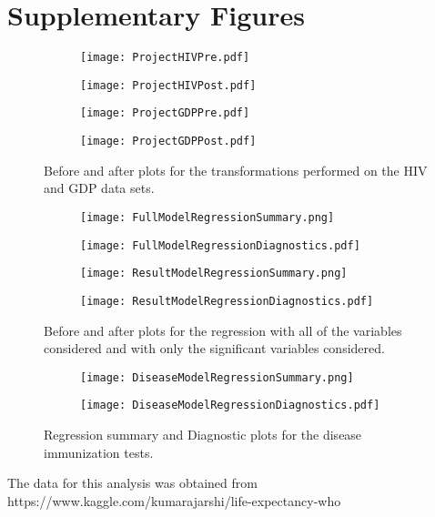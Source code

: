 \documentclass{article}
\begin{document}
\section*{Supplementary Figures}
	\begin{figure}[ht]
	\centering
		\begin{subfigure}[b]{0.49\textwidth}
			\centering
			\texttt{[image: ProjectHIVPre.pdf]}
		\end{subfigure}
		\begin{subfigure}[b]{0.49\textwidth}
			\centering
			\texttt{[image: ProjectHIVPost.pdf]}
		\end{subfigure}
		\begin{subfigure}[b]{0.49\textwidth}
			\centering
			\texttt{[image: ProjectGDPPre.pdf]}
		\end{subfigure}
		\begin{subfigure}[b]{0.49\textwidth}
			\centering
			\texttt{[image: ProjectGDPPost.pdf]}
		\end{subfigure}
	\caption{Before and after plots for the transformations performed on the HIV and GDP data sets.}
	\vspace{-3cm}
	\end{figure}
\newpage
	\begin{figure}[ht]
	\centering
		\begin{subfigure}[b]{0.49\textwidth}
			\centering
			\texttt{[image: FullModelRegressionSummary.png]}
		\end{subfigure}
		\begin{subfigure}[b]{0.49\textwidth}
			\centering
			\texttt{[image: FullModelRegressionDiagnostics.pdf]}
		\end{subfigure}
		\begin{subfigure}[b]{0.49\textwidth}
			\centering
			\texttt{[image: ResultModelRegressionSummary.png]}
		\end{subfigure}
		\begin{subfigure}[b]{0.49\textwidth}
			\centering
			\texttt{[image: ResultModelRegressionDiagnostics.pdf]}
		\end{subfigure}
	\caption{Before and after plots for the regression with all of the variables considered and with only the significant variables considered.}
	\vspace{-3cm}
	\end{figure}
\newpage
	\begin{figure}[ht]
	\centering
		\begin{subfigure}[b]{0.49\textwidth}
			\centering
			\texttt{[image: DiseaseModelRegressionSummary.png]}
		\end{subfigure}
		\begin{subfigure}[b]{0.49\textwidth}
			\centering
			\texttt{[image: DiseaseModelRegressionDiagnostics.pdf]}
		\end{subfigure}
	\caption{Regression summary and Diagnostic plots for the disease immunization tests.}
	\end{figure}

The data for this analysis was obtained from https://www.kaggle.com/kumarajarshi/life-expectancy-who
\end{document}
